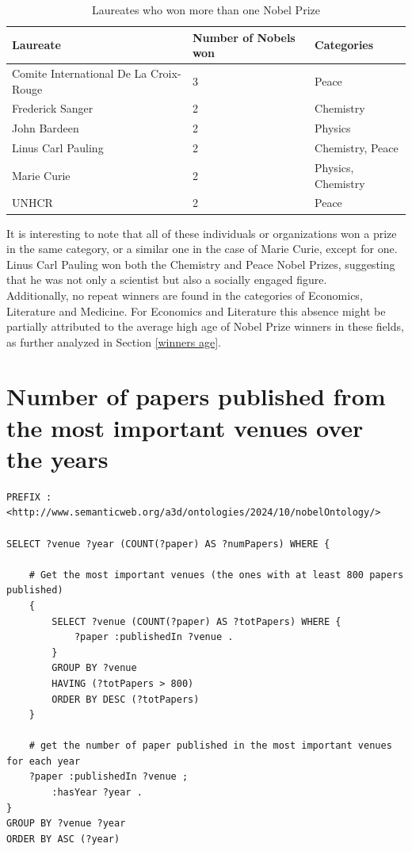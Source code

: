 \documentclass{article}
\begin{document}
\begin{table}[H]
	\caption{Laureates who won more than one Nobel Prize}
	\centering
	\begin{tabular}{|l|l|l|}
		\hline
		\textbf{Laureate}                      & \textbf{Number of Nobels won} & \textbf{Categories} \\ \hline
		Comite International De La Croix-Rouge & 3                             & Peace               \\ \hline
		Frederick Sanger                       & 2                             & Chemistry           \\ \hline
		John Bardeen                           & 2                             & Physics             \\ \hline
		Linus Carl Pauling                     & 2                             & Chemistry, Peace    \\ \hline
		Marie Curie                            & 2                             & Physics, Chemistry  \\ \hline
		UNHCR                                  & 2                             & Peace               \\ \hline
	\end{tabular}
	\label{tab:moreThanOneNobel}
\end{table}

It is interesting to note that all of these individuals or organizations won a prize in the same category,
or a similar one in the case of Marie Curie, except for one. Linus Carl Pauling won both the Chemistry and Peace Nobel Prizes,
suggesting that he was not only a scientist but also a socially engaged figure.\\
Additionally, no repeat winners are found in the categories of Economics, Literature and Medicine.
For Economics and Literature this absence might be partially attributed to the average high age of Nobel Prize
winners in these fields, as further analyzed in Section \ref{winners age}.\\

\section{Number of papers published from the most important venues over the years}

\begin{lstlisting}
PREFIX : <http://www.semanticweb.org/a3d/ontologies/2024/10/nobelOntology/>

SELECT ?venue ?year (COUNT(?paper) AS ?numPapers) WHERE {

    # Get the most important venues (the ones with at least 800 papers published)
    {
        SELECT ?venue (COUNT(?paper) AS ?totPapers) WHERE {
            ?paper :publishedIn ?venue .
        }
        GROUP BY ?venue
        HAVING (?totPapers > 800)
        ORDER BY DESC (?totPapers)
    }

    # get the number of paper published in the most important venues for each year
    ?paper :publishedIn ?venue ;
        :hasYear ?year .
}
GROUP BY ?venue ?year
ORDER BY ASC (?year)
\end{lstlisting}
\end{document}

